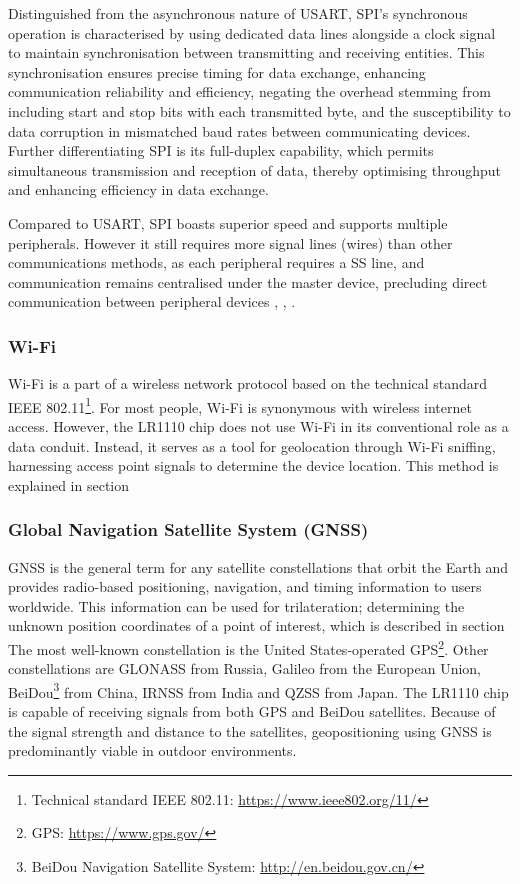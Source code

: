Distinguished from the asynchronous nature of \ac{USART}, \ac{SPI}'s synchronous operation is characterised by using dedicated data lines alongside a clock signal to maintain synchronisation between transmitting and receiving entities. This synchronisation ensures precise timing for data exchange, enhancing communication reliability and efficiency, negating the overhead stemming from including start and stop bits with each transmitted byte, and the susceptibility to data corruption in mismatched baud rates between communicating devices.
Further differentiating \ac{SPI} is its full-duplex capability, which permits simultaneous transmission and reception of data, thereby optimising throughput and enhancing efficiency in data exchange.

Compared to \ac{USART}, \ac{SPI} boasts superior speed and supports multiple peripherals. However it still requires more signal lines (wires) than other communications methods, as each peripheral requires a \ac{SS} line, and communication remains centralised under the master device, precluding direct communication between peripheral devices \cite{SPI_analog}, \cite{SPI_sparkfun}, \cite{SPI_wiki}.

\subsubsection{Wi-Fi}
Wi-Fi is a part of a wireless network protocol based on the technical standard IEEE 802.11\footnote{Technical standard IEEE 802.11: \url{https://www.ieee802.org/11/}}. For most people, Wi-Fi is synonymous with wireless internet access. However, the LR1110 chip does not use Wi-Fi in its conventional role as a data conduit. Instead, it serves as a tool for geolocation through Wi-Fi sniffing, harnessing access point signals to determine the device location. This method is explained in section %

\subsubsection{Global Navigation Satellite System (GNSS)}
\ac{GNSS} is the general term for any satellite constellations that orbit the Earth and provides radio-based positioning, navigation, and timing information to users worldwide. This information can be used for trilateration; determining the unknown position coordinates of a point of interest, which is described in section %
The most well-known constellation is the United States-operated \ac{GPS}\footnote{GPS: \url{https://www.gps.gov/}}. Other constellations are GLONASS from Russia, Galileo from the European Union, BeiDou\footnote{BeiDou Navigation Satellite System: \url{http://en.beidou.gov.cn/}} from China, IRNSS from India and QZSS from Japan. The LR1110 chip is capable of receiving signals from both \ac{GPS} and BeiDou satellites.
Because of the signal strength and distance to the satellites, geopositioning using GNSS is predominantly viable in outdoor environments.

